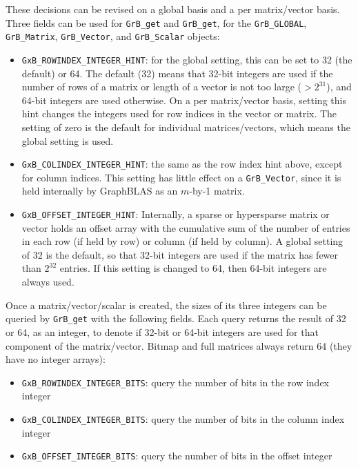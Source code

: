 These decisions can be revised on a global basis and a per matrix/vector basis.
Three fields can be used for \verb'GrB_get' and \verb'GrB_get', for the
\verb'GrB_GLOBAL', \verb'GrB_Matrix', \verb'GrB_Vector', and \verb'GrB_Scalar'
objects:

\begin{itemize}
\item \verb'GxB_ROWINDEX_INTEGER_HINT': for the global setting, this can be
set to 32 (the default) or 64.  The default (32) means that 32-bit integers are
used if the number of rows of a matrix or length of a vector is not too
large ($>2^{31}$), and 64-bit integers are used otherwise.  On a per
matrix/vector basis, setting this hint changes the integers used for row
indices in the vector or matrix.  The setting of zero is the default for
individual matrices/vectors, which means the global setting is used.
\item \verb'GxB_COLINDEX_INTEGER_HINT':  the same as the row index hint above,
except for column indices.  This setting has little effect on a
\verb'GrB_Vector', since it is held internally by GraphBLAS as an $m$-by-1
matrix.
\item \verb'GxB_OFFSET_INTEGER_HINT':  Internally, a sparse or hypersparse
matrix or vector holds an offset array with the cumulative sum of the number of
entries in each row (if held by row) or column (if held by column).  A global
setting of 32 is the default, so that 32-bit integers are used if the matrix
has fewer than $2^{32}$ entries. If this setting is changed to 64, then 64-bit
integers are always used.
\end{itemize}

Once a matrix/vector/scalar is created, the sizes of its three integers can be
queried by \verb'GrB_get' with the following fields.  Each query returns the
result of 32 or 64, as an integer, to denote if 32-bit or 64-bit integers are
used for that component of the matrix/vector.  Bitmap and full matrices always
return 64 (they have no integer arrays):

\begin{itemize}
\item \verb'GxB_ROWINDEX_INTEGER_BITS': query the number of bits in the row index integer
\item \verb'GxB_COLINDEX_INTEGER_BITS': query the number of bits in the column index integer
\item \verb'GxB_OFFSET_INTEGER_BITS': query the number of bits in the offset integer
\end{itemize}

